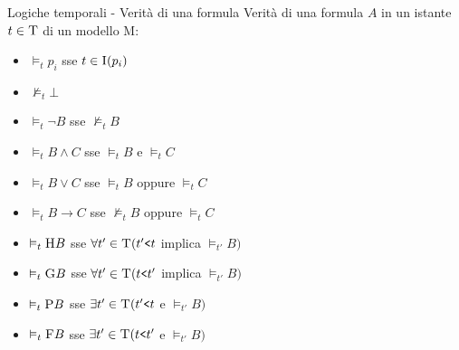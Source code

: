 \documentclass{beamer}
\begin{document}
\begin{frame}{Logiche temporali - Verità di una formula}
    Verità di una formula $A$ in un istante $t \in \textsc{T}$ di un modello \textsc{M}:
    \begin{itemize}
        \item $\vDash_t p_i$ \hspace{2em} sse \hspace{2em} $t \in \textsc{I}(p_i)$
        \item $\nvDash_t \bot$
        \item $\vDash_t \neg B$ \hspace{3em} sse \hspace{2em} $\nvDash_t B$
        \item $\vDash_t B \land C$ \hspace{2em} sse \hspace{2em} $\vDash_t B$ e $\vDash_t C$
        \item $\vDash_t B \lor C$ \hspace{2.05em} sse \hspace{2em} $\vDash_t B$ oppure $\vDash_t C$
        \item $\vDash_t B \to C$ \hspace{1.6em} sse \hspace{2em} $\nvDash_t B$ oppure $\vDash_t C$
        \medskip
        \item $\vDash_t \textsc{H}B$ \hspace{2em} sse \hspace{2em} $\forall {t'} \in \textsc{T} ({t'} \texttt{<} t$ implica $\vDash_{t'} B)$
        \item $\vDash_t \textsc{G}B$ \hspace{2em} sse \hspace{2em} $\forall {t'} \in \textsc{T} (t \texttt{<} {t'}$ implica $\vDash_{t'} B)$
        \item $\vDash_t \textsc{P}B$ \hspace{2.14em} sse \hspace{2em} $\exists {t'} \in \textsc{T} ({t'} \texttt{<} t$ e $\vDash_{t'} B)$
        \item $\vDash_t \textsc{F}B$ \hspace{2.15em} sse \hspace{2em} $\exists {t'} \in \textsc{T} (t \texttt{<} {t'}$ e $\vDash_{t'} B)$
    \end{itemize}
\end{frame}
\end{document}
